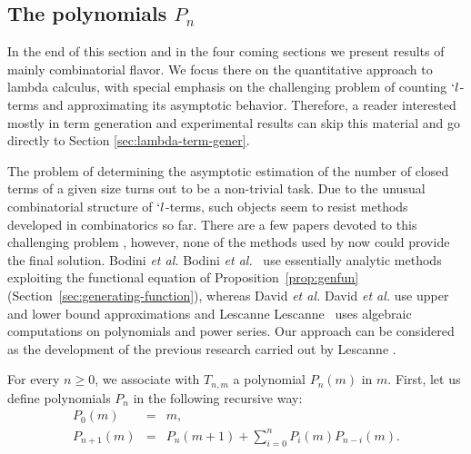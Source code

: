 \documentclass{jfp1}
\begin{document}
\subsection{The polynomials $P_n$}
\begin{it}
  \begin{small}
    In the end of this section and in the four coming sections we present results of
    mainly combinatorial flavor. We focus there on the quantitative approach to
    lambda calculus, with special emphasis on the challenging problem of counting
    $`l$-terms and approximating its asymptotic behavior.  Therefore, a reader
    interested mostly in term generation and experimental results can skip this
    material and go directly to Section \ref{sec:lambda-term-gener}.
  \end{small}
\end{it}

\medskip

The problem of determining the asymptotic estimation of the number of closed terms of
a given size turns out to be a non-trivial task. Due to the unusual combinatorial
structure of $`l$-terms, such objects seem to resist methods developed in
combinatorics so far. There are a few papers devoted to this challenging problem
\cite{gittenberger-2011-ltbuh,
  DBLP:journals/corr/abs-0903-5505,DBLP:journals/tcs/Lescanne13}, however, none of
the methods used by now could provide the final solution.  \ifJFP Bodini \emph{et
  al.}  \else Bodini \emph{et
  al.}~\cite{gittenberger-2011-ltbuh} \fi use essentially analytic methods exploiting
the functional equation of Proposition~\ref{prop:genfun}
(Section~\ref{sec:generating-function}), whereas \ifJFP David \emph{et al.}
 \else  David \emph{et al.}
\cite{DBLP:journals/corr/abs-0903-5505} \fi use upper and lower bound approximations
and \ifJFP Lescanne  \else
Lescanne~\cite{DBLP:journals/tcs/Lescanne13} \fi uses algebraic computations on
polynomials and power series.  Our approach can be considered as the development of
the previous research carried out by \ifJFP Lescanne
\else \cite{DBLP:journals/tcs/Lescanne13}\fi.

For every $n \geq 0$, we associate with $T_{n,m}$ a polynomial $P_n(m)$ in $m$. First, let us define polynomials $P_n$ in the following recursive way:
\begin{eqnarray*}
 P_0(m) &=& m,\\
 P_{n+1}(m) &= & P_n(m+1) + \sum_{i=0}^{n} P_{i}(m) P_{n-i}(m).
\end{eqnarray*}
\end{document}
